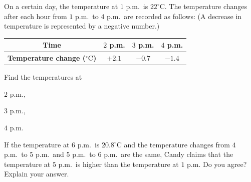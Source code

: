 On a certain day, the temperature at $1$ p.m.\ is $22^\circ\text{C}$. The temperature changes after each hour from $1$ p.m.\ to $4$ p.m.\ are recorded as follows: (A decrease in temperature is represented by a negative number.)

\begin{center}
\begin{tabular}{|c|c|c|c|}
\hline
\textbf{Time} & $2$ p.m. & $3$ p.m. & $4$ p.m. \\
\hline
\textbf{Temperature change ($^\circ\text{C}$)} & $+2.1$ & $-0.7$ & $-1.4$ \\
\hline
\end{tabular}
\end{center}

\begin{subparts}
  \item Find the temperatures at
  \begin{subpartsii}
    \item $2$ p.m.,
    \item $3$ p.m.,
    \item $4$ p.m.
  \end{subpartsii}
  \item If the temperature at $6$ p.m.\ is $20.8^\circ\text{C}$ and the temperature changes from $4$ p.m.\ to $5$ p.m.\ and $5$ p.m.\ to $6$ p.m.\ are the same, Candy claims that the temperature at $5$ p.m.\ is higher than the temperature at $1$ p.m. Do you agree? Explain your answer.
\end{subparts}

